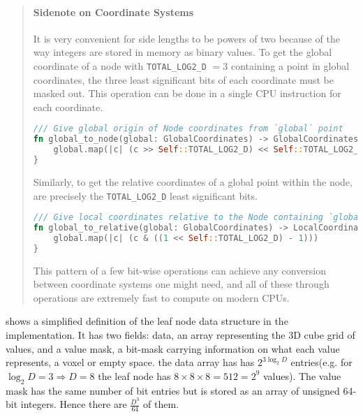 \begin{quote}
  \paragraph{Sidenote on Coordinate Systems}

  It is very convenient for side lengths to be powers of two because of the way integers are stored in memory as binary values. To get the global coordinate of a node with \verb|TOTAL_LOG2_D| $= 3$ containing a point in global coordinates, the three least significant bits of each coordinate must be masked out. This operation can be done in a single CPU instruction for each coordinate.

\begin{lstlisting}[language=rust]
/// Give global origin of Node coordinates from `global` point
fn global_to_node(global: GlobalCoordinates) -> GlobalCoordinates {
    global.map(|c| (c >> Self::TOTAL_LOG2_D) << Self::TOTAL_LOG2_D)
}
\end{lstlisting}

Similarly, to get the relative coordinates of a global point within the node, are precisely the \texttt{TOTAL\_LOG2\_D} least significant bits.

\begin{lstlisting}[language=rust]
/// Give local coordinates relative to the Node containing `global` position
fn global_to_relative(global: GlobalCoordinates) -> LocalCoordinates {
    global.map(|c| (c & ((1 << Self::TOTAL_LOG2_D) - 1)))
}
\end{lstlisting}

This pattern of a few bit-wise operations can achieve any conversion between coordinate systems one might need, and all of these through operations are extremely fast to compute on modern CPUs.
\end{quote}

 shows a simplified definition of the leaf node data structure in the implementation. It has two fields: data, an array representing the 3D cube grid of values, and a value mask, a bit-mask carrying information on what each value represents, a voxel or empty space. the data array has has $2^{3\log_{2} D}$ entries(e.g. for $\log_{2} D = 3 \Rightarrow D = 8$ the leaf node has $8\times8\times8 = 512 = 2^{9}$ values). The value mask has the same number of bit entries but is stored as an array of unsigned 64-bit integers. Hence there are $\frac{D^{3}}{64}$ of them.

